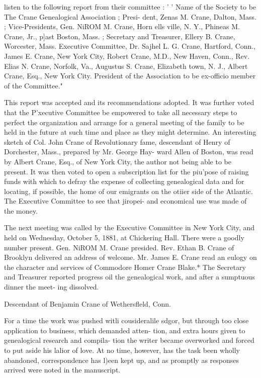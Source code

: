 \documentclass[oneside]{book}
\begin{document}
listen to the following report from their committee : ' ' Name of 
the Society to be The Crane Genealogical Association ; Presi- 
dent, Zenas M. Crane, Dalton, Mass. ; Vice-Presidents, Gen. 
NiROM M. Crane, Horn ells ville, N. Y., Phineas M. Crane, Jr., 
p]ast Boston, Mass. ; Secretary and Treasurer, Ellery B. 
Crane, Worcester, Mass. Executive Committee, Dr. Sajhel 
L. G. Crane, Hartford, Conn., James E. Crane, New York 
City, Robert Crane, M.D., New Haven, Conn., Rev. Elias N. 
Crane, Norfolk, Va., Augustus S. Crane, Elizabeth town, N. 
J., Albert Crane, Esq., New York City. President of the 
Association to be ex-officio member of the Committee." 

This report was accepted and its recommendations adopted. 
It was further voted that the P'xecutive Committee be empowered 
to take all necessary steps to perfect the organization and arrange 
for a general meeting of the family to be held in the future at 
such time and place as they might determine. An interesting 
sketch of Col. John Crane of Revolutionary fame, descendant 
of Henry of Dorchester, Mass., prepared by Mr. George Hay- 
ward Allen of Boston, was read by Albert Crane, Esq., of New 
York City, the author not being able to be present. It was then 
voted to open a subscription list for the piu'pose of raising funds 
with which to defray the expense of collecting genealogical data 
and for locating, if possible, the home of our emigrants on the 
otiier side of the Atlantic. The Executive Committee to see that 
jiropei- and economical use was made of the money. 

The next meeting was called by the Executive Committee in 
New York City, and held on Wednesday, October 5, 1881, at 
Chickering Hall. There were a goodly number present. Gen. 
NiROM M. Crane presided. Rev. Ethan B. Crane of Brooklyn 
delivered an address of welcome. Mr. James E. Crane read an 
eulogy on the character and services of Commodore Homer 
Crane Blake.* The Secretary and Treasurer reported progress 
oil the genealogical work, and after a sumptuous dinner the meet- 
ing dissolved. 



Descendant of Benjamin Crane of Wethersfleld, Conn. 



For a time the work was pushed witli cousideralile sdgor, but 
through too close application to business, which demanded atten- 
tion, and extra hours given to genealogical research and compila- 
tion the writer became overworked and forced to put aside his 
lalior of love. At no time, however, has the task been wholly 
abandoned, correspondence has l)een kept up, and as promptly as 
responses arrived were noted in the manuscript. 
\end{document}
